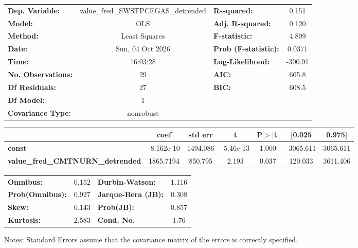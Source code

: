 \begin{center}
\begin{tabular}{lclc}
\toprule
\textbf{Dep. Variable:}                  & value\_fred\_SWSTPCEGAS\_detrended & \textbf{  R-squared:         } &     0.151   \\
\textbf{Model:}                          &                OLS                 & \textbf{  Adj. R-squared:    } &     0.120   \\
\textbf{Method:}                         &           Least Squares            & \textbf{  F-statistic:       } &     4.809   \\
\textbf{Date:}                           &          Sun, 04 Oct 2026          & \textbf{  Prob (F-statistic):} &   0.0371    \\
\textbf{Time:}                           &              16:03:28              & \textbf{  Log-Likelihood:    } &   -300.91   \\
\textbf{No. Observations:}               &                   29               & \textbf{  AIC:               } &     605.8   \\
\textbf{Df Residuals:}                   &                   27               & \textbf{  BIC:               } &     608.5   \\
\textbf{Df Model:}                       &                    1               & \textbf{                     } &             \\
\textbf{Covariance Type:}                &             nonrobust              & \textbf{                     } &             \\
\bottomrule
\end{tabular}
\begin{tabular}{lcccccc}
                                         & \textbf{coef} & \textbf{std err} & \textbf{t} & \textbf{P$> |$t$|$} & \textbf{[0.025} & \textbf{0.975]}  \\
\midrule
\textbf{const}                           &   -8.162e-10  &     1494.086     & -5.46e-13  &         1.000        &    -3065.611    &     3065.611     \\
\textbf{value\_fred\_CMTNURN\_detrended} &    1865.7194  &      850.795     &     2.193  &         0.037        &      120.033    &     3611.406     \\
\bottomrule
\end{tabular}
\begin{tabular}{lclc}
\textbf{Omnibus:}       &  0.152 & \textbf{  Durbin-Watson:     } &    1.116  \\
\textbf{Prob(Omnibus):} &  0.927 & \textbf{  Jarque-Bera (JB):  } &    0.308  \\
\textbf{Skew:}          &  0.143 & \textbf{  Prob(JB):          } &    0.857  \\
\textbf{Kurtosis:}      &  2.583 & \textbf{  Cond. No.          } &     1.76  \\
\bottomrule
\end{tabular}
\end{center}

Notes: \newline
 [1] Standard Errors assume that the covariance matrix of the errors is correctly specified.